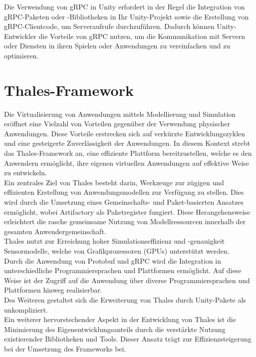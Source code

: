 Die Verwendung von gRPC in Unity erfordert in der Regel die Integration von gRPC-Paketen oder -Bibliotheken in Ihr Unity-Projekt sowie die Erstellung von gRPC-Clientcode, um Serveraufrufe durchzuführen. Dadurch können Unity-Entwickler die Vorteile von gRPC nutzen, um die Kommunikation mit Servern oder Diensten in ihren Spielen oder Anwendungen zu vereinfachen und zu optimieren.\\

\section{Thales-Framework}
Die Virtualisierung von Anwendungen mittels Modellierung und Simulation eröffnet eine Vielzahl von Vorteilen gegenüber der Verwendung physischer Anwendungen. Diese Vorteile erstrecken sich auf verkürzte Entwicklungszyklen und eine gesteigerte Zuverlässigkeit der Anwendungen. In diesem Kontext strebt das Thales-Framework an, eine effiziente Plattform bereitzustellen, welche es den Anwendern ermöglicht, ihre eigenen virtuellen Anwendungen auf effektive Weise zu entwickeln.\\

Ein zentrales Ziel von Thales besteht darin, Werkzeuge zur zügigen und effizienten Erstellung von Anwendungsmodellen zur Verfügung zu stellen. Dies wird durch die Umsetzung eines Gemeinschafts- und Paket-basierten Ansatzes ermöglicht, wobei Artifactory als Paketregister fungiert. Diese Herangehensweise erleichtert die rasche gemeinsame Nutzung von Modellressourcen innerhalb der gesamten Anwendergemeinschaft.\\

Thales nutzt zur Erreichung hoher Simulationseffizienz und -genauigkeit Sensormodelle, welche von Grafikprozessoren (GPUs) unterstützt werden.\\

Durch die Anwendung von Protobuf und gRPC wird die Integration in unterschiedliche Programmiersprachen und Plattformen ermöglicht. Auf diese Weise ist der Zugriff auf die Anwendung über diverse Programmiersprachen und Plattformen hinweg realisierbar. \\

Des Weiteren gestaltet sich die Erweiterung von Thales durch Unity-Pakete als unkompliziert.\\

Ein weiterer hervorstechender Aspekt in der Entwicklung von Thales ist die Minimierung des Eigenentwicklungsanteils durch die verstärkte Nutzung existierender Bibliotheken und Tools. Dieser Ansatz trägt zur Effizienzsteigerung bei der Umsetzung des Frameworks bei.\cite{.02.09.2023}\\

